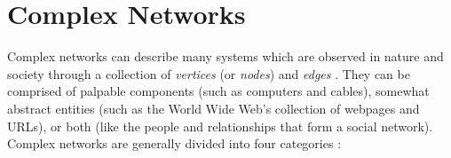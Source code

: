 \chapter{Complex Networks}
\label{chap:complexnetworks}


%


Complex networks can describe many systems which are observed in nature and society through a collection of \textit{vertices} (or \textit{nodes}) and \textit{edges} \citep{newmannetworks}.
They can be comprised of palpable components (such as computers and cables), somewhat abstract entities (such as the World Wide Web's collection of webpages and URLs), or both (like the people and relationships that form a social network).
Complex networks are generally divided into four categories \citep{newmannetworks}:

